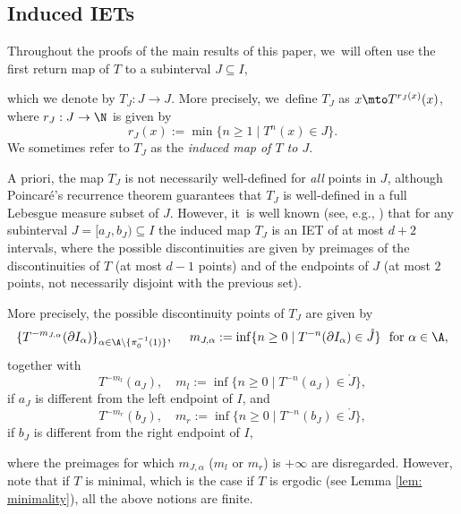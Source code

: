 \subsection{Induced IETs}\label{sc:induced_IETs}
Throughout the proofs of the main results of this paper, we~will often use the first return map of $T$ to a subinterval $J \subseteq I$, {which we denote by $T_J: J \to J$. More precisely, we~define $T_J$ as $x \mto T^{r_J(x)}(x)$, where $r_J: J \to \N$ is given by
\[
 r_J(x):= \min\{n \geq 1 \mid T^n(x) \in J\}.
\]
We sometimes refer to $T_J$ as the \emph{induced map of $T$ to $J$}.

A priori, the map $T_J$ is not necessarily well-defined for \emph{all} points in $J$, although Poincaré's recurrence theorem guarantees that $T_J$ is well-defined in a full Lebesgue measure subset of $J$. However, it~is well known (see, e.g., \cite[\S 3]{veech_interval_1978}) that for any subinterval $J=[a_J,b_J)\subseteq I$ the induced map $T_J$ is an IET of at most $d+2$ intervals, where the possible discontinuities are given by preimages of the discontinuities of $T$ (at most $d - 1$ points) and of the endpoints of $J$ (at most $2$ points, not necessarily disjoint with the previous set).

More precisely, the possible discontinuity points of $T_J$ are given by
\[
\{T^{-m_{J,\alpha}}(\partial I_{\alpha})\}_{\alpha\in \A \setminus \{\pi_0^{-1}(1)\}}, \quad\ m_{J,\alpha}:=\inf\{n\geq 0 \mid T^{-n}(\partial I_{\alpha})\in \mathring{J}\} \text{ \ for } \alpha \in \A,
\]
together with
\[
T^{-m_l}(a_J), \quad m_l :=\inf\{n\ge 0 \mid T^{-n}(a_J)\in \mathring{J}\},
\]
if $a_J$ is different from the left endpoint of $I$, and
\[
T^{-m_r}(b_J), \quad m_r :=\inf\{n\ge 0 \mid T^{-n}(b_J)\in \mathring{J}\},
\]
if $b_J$ is different from the right endpoint of $I$,} where the preimages for
which $m_{J, \alpha}$ (\resp $m_l$ or $m_r$) is $+\infty$ are disregarded.
However, note that if $T$ is minimal, which is the case if $T$ is ergodic (see
Lemma \ref{lem: minimality}), all the above notions are finite.

